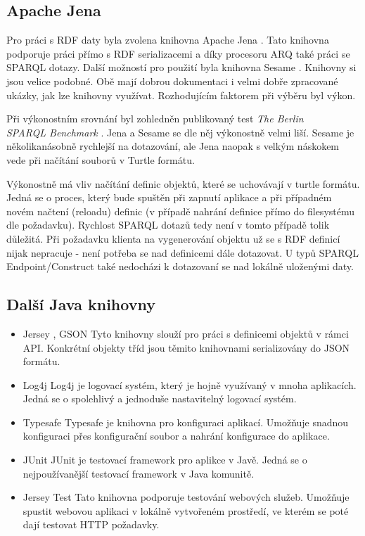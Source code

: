 \documentclass[thesis=B,czech]{FITthesis}[2012/06/26]
\begin{document}
   \subsection{Apache Jena}
   Pro práci s RDF daty byla zvolena knihovna Apache Jena \cite{jena}. Tato knihovna podporuje práci přímo s RDF serializacemi a díky procesoru ARQ také práci se SPARQL
   dotazy. Další možností pro použití byla knihovna Sesame \cite{sesame}. Knihovny si jsou velice podobné. Obě mají dobrou dokumentaci i velmi dobře zpracované 
   ukázky, jak lze knihovny využívat. Rozhodujícím faktorem při výběru byl výkon.
   
   Při výkonostním srovnání byl zohledněn publikovaný test \textit{The Berlin\\ SPARQL Benchmark} \cite{sparql_benchmark}.
   Jena a Sesame se dle něj výkonostně velmi liší. Sesame je několikanásobně rychlejší na dotazování, ale Jena naopak s velkým náskokem vede při načítání souborů
   v Turtle formátu.
   
   Výkonostně má vliv načítání definic objektů, které se uchovávají v turtle formátu. Jedná se o proces, který bude spuštěn při zapnutí aplikace a při
   případném novém načtení (reloadu) definic (v případě nahrání definice přímo do filesystému dle požadavku). Rychlost SPARQL dotazů tedy není v tomto
   případě tolik důležitá. Při požadavku klienta na vygenerování objektu už se s RDF definicí nijak nepracuje - není potřeba se nad definicemi dále dotazovat.
   U typů SPARQL Endpoint/Construct také nedocházi k dotazovaní se nad lokálně uloženými daty.
   
   \subsection{Další Java knihovny}
   \begin{itemize}
    \item Jersey \cite{jersey}, GSON \cite{gson}
    \subitem Tyto knihovny slouží pro práci s definicemi objektů v rámci API. Konkrétní objekty tříd jsou těmito knihovnami serializovány
      do JSON formátu.
    \item Log4j \cite{log4j} 
    \subitem Log4j je logovací systém, který je hojně využívaný v mnoha aplikacích. Jedná se o spolehlivý a jednoduše nastavitelný logovací systém.
    \item Typesafe \cite{typesafe}
    \subitem Typesafe je knihovna pro konfiguraci aplikací. Umožňuje snadnou konfiguraci přes konfigurační soubor a nahrání konfigurace do aplikace.	
    \item JUnit \cite{junit}
    \subitem JUnit je testovací framework pro aplikce v Javě. Jedná se o nejpoužívanější testovací framework v Java komunitě.
    \item Jersey Test \cite{jersey_test}
    \subitem Tato knihovna podporuje testování webových služeb. Umožňuje spustit webovou aplikaci v lokálně vytvořeném prostředí, ve kterém se poté
    dají testovat HTTP požadavky.
   \end{itemize}
   
\end{document}
